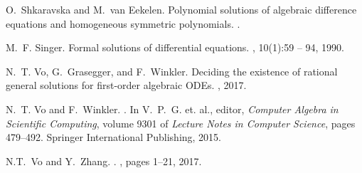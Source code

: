 \documentclass[10pt,a4paper]{article}
\begin{document}
\begin{thebibliography}{10}

O.~Shkaravska and M.~van Eekelen.
\newblock Polynomial solutions of algebraic difference equations and
  homogeneous symmetric polynomials.
.

M.~F. Singer.
\newblock Formal solutions of differential equations.
, 10(1):59 -- 94, 1990.




N.~T. Vo, G.~Grasegger, and F.~Winkler.
\newblock Deciding the existence of rational general solutions for first-order
  algebraic {ODEs}.
, 2017.

N.~T. Vo and F.~Winkler.
.
\newblock In V.~P.~G. et. al., editor, {\em {Computer Algebra in Scientific
  Computing}}, volume 9301 of {\em Lecture Notes in Computer Science}, pages
  479--492. Springer International Publishing, 2015.
  
  

N.T.~Vo and Y.~Zhang.
.
, pages 1--21,  2017.


\end{thebibliography}
\end{document}
